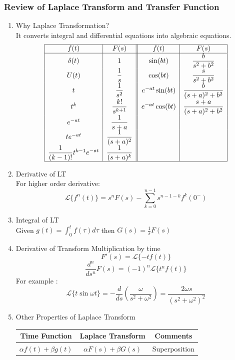 \subsubsection{Review of Laplace Transform and Transfer Function}
\begin{enumerate}
\item  Why Laplace Transformation? \\
It converts integral and differential equations into algebraic equations.\\
\[
\begin{array}{|c|c||c|c|}
\hline
f(t) & F(s) & f(t) & F(s) \\
\hline
\delta(t) & 1 & \sin(bt) & \dfrac{b}{s^2+b^2} \\
U(t) & \dfrac{1}{s} & \cos(bt) & \dfrac{s}{s^2+b^2} \\
t & \dfrac{1}{s^2} & e^{-at} \sin(bt) & \dfrac{b}{(s+a)^2+b^2} \\
t^k & \dfrac{k!}{s^{k+1}} & e^{-at} \cos(bt) & \dfrac{s+a}{(s+a)^2+b^2} \\
e^{-at} & \dfrac{1}{s+a} & & \\
te^{-at} & \dfrac{1}{(s+a)^2} & & \\
\dfrac{1}{(k-1)!}t^{k-1}e^{-at} & \dfrac{1}{(s+a)^k} & & \\
\hline
\end{array}
\]
\item Derivative of LT \\
For higher order derivative: 
\[\displaystyle \mathscr{L}\{f^n(t)\} = s^n F(s) - \sum_{k=0}^{n-1} s^{n-1-k} f^k(0^-)\]
\item Integral of LT \\
Given $\displaystyle g(t) = \int_0^t f(\tau)d\tau$ then $\displaystyle G(s) = \frac{1}{s}F(s)$
\item Derivative of Transform Multiplication by time
\[F'(s) = \mathcal{L}\{-tf(t)\}\]
\[\frac{d^n}{ds^n}F(s) = (-1)^n \mathcal{L}\{t^n f(t)\}\]
For example : 
\[\mathcal{L}\{t\sin\omega t\} = -\frac{d}{ds} \left( \frac{\omega}{s^2 + \omega^2} \right) = \frac{2\omega s}{(s^2 + \omega^2)^2}
\]
\newpage
\item Other Properties of Laplace Transform
    \begin{table}[h]
    \begin{center}
    \begin{tabular}{|c|c|c|}
    \hline
    \textbf{Time Function} & \textbf{Laplace Transform} & \textbf{Comments} \\ \hline
    $\alpha f(t) + \beta g(t)$ & $\alpha F(s) + \beta G(s)$ &  Superposition \\ \hline

\end{tabular}
\end{center}
\end{table}
\end{enumerate}
